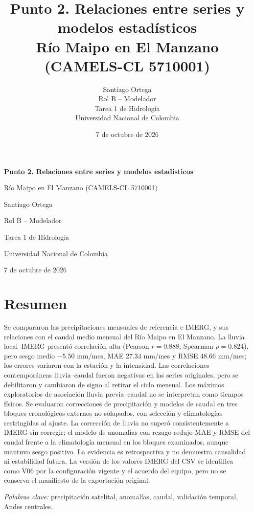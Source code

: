 \documentclass[12pt,letterpaper]{article}
\title{Punto 2. Relaciones entre series y modelos estadísticos\\
\large Río Maipo en El Manzano (CAMELS-CL 5710001)}
\author{Santiago Ortega\\Rol B -- Modelador\\Tarea 1 de Hidrología\\Universidad Nacional de Colombia}
\date{7 de octubre de 2026}
\begin{document}
\sloppy
\begin{titlepage}
\thispagestyle{fancy}
\centering
\vspace*{2.0cm}
{\bfseries\Large Punto 2. Relaciones entre series y modelos estadísticos\par}
\vspace{0.7cm}
{\large Río Maipo en El Manzano (CAMELS-CL 5710001)\par}
\vspace{1.7cm}
{\large Santiago Ortega\par}
{\normalsize Rol B -- Modelador\par}
\vfill
{\normalsize Tarea 1 de Hidrología\par}
{\normalsize Universidad Nacional de Colombia\par}
{\normalsize 7 de octubre de 2026\par}
\end{titlepage}

\section*{Resumen}
Se compararon las precipitaciones mensuales de referencia e IMERG, y sus relaciones con el caudal medio mensual del Río Maipo en El Manzano. La lluvia local--IMERG presentó correlación alta (Pearson $r=0.888$; Spearman $\rho=0.824$), pero sesgo medio $-5.50$ mm/mes, MAE $27.34$ mm/mes y RMSE $48.66$ mm/mes; los errores variaron con la estación y la intensidad. Las correlaciones contemporáneas lluvia--caudal fueron negativas en las series originales, pero se debilitaron y cambiaron de signo al retirar el ciclo mensual. Los máximos exploratorios de asociación lluvia previa--caudal no se interpretan como tiempos físicos. Se evaluaron correcciones de precipitación y modelos de caudal en tres bloques cronológicos externos no solapados, con selección y climatologías restringidas al ajuste. La corrección de lluvia no superó consistentemente a IMERG sin corregir; el modelo de anomalías con rezago redujo MAE y RMSE del caudal frente a la climatología mensual en los bloques examinados, aunque mantuvo sesgo positivo. La evidencia es retrospectiva y no demuestra causalidad ni estabilidad futura. La versión de los valores IMERG del CSV se identifica como V06 por la configuración vigente y el acuerdo del equipo, pero no se conserva el manifiesto de la exportación original.

\noindent\textit{Palabras clave:} precipitación satelital, anomalías, caudal, validación temporal, Andes centrales.
\end{document}
